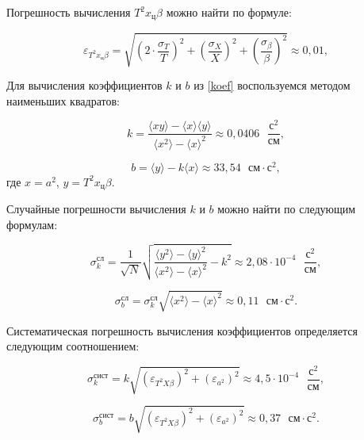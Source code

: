 \documentclass[a4paper,12pt]{article}
\begin{document}
 	Погрешность вычисления $ T^2x_\text{ц}\beta $ можно найти по формуле:
 	
 	\begin{equation}
 		\varepsilon_{T^2x_\text{ц}\beta} = \sqrt{\left( 2\cdot\frac{\sigma_T}{T} \right)^2 + \left(  \frac{\sigma_X}{X} \right)^2 + \left(\frac{\sigma_{\beta}}{\beta}\right)^2} \approx 0,01  ,
 	\end{equation}
 	
 	Для вычисления коэффициентов $ k $ и $ b $ из \eqref{koef} воспользуемся методом наименьших квадратов:
 	
 	\begin{equation}
 		k=\frac{\langle xy\rangle-\langle x\rangle \langle y\rangle}{\langle x^2\rangle - \langle x\rangle^2}\approx 0,0406\text{ }\frac{\text{с}^2}{\text{см}},
 	\end{equation}
 	
 	\begin{equation}
 		b=\langle y \rangle -k\langle x \rangle\approx 33,54\text{ }\text{см}\cdot\text{с}^2,
 	\end{equation}
 	где $ x=a^2 $, $ y=T^2x_\text{ц}\beta $.
 	
 	Случайные погрешности вычисления $ k $ и $ b $ можно найти по следующим формулам:
 	
 	\begin{equation}
 		\sigma_k^\text{сл}=\frac{1}{\sqrt{N}}\sqrt{\frac{\langle y^2 \rangle - \langle y \rangle^2}{\langle x^2 \rangle - \langle x \rangle^2} - k^2  } \approx 2,08\cdot10^{-4} \text{ }\frac{\text{с}^2}{\text{см}},
 	\end{equation}
 	
 	\begin{equation}
 		\sigma_b^\text{сл}= \sigma_k^\text{сл} \sqrt{\langle x^2 \rangle - \langle x \rangle^2} \approx 0,11 \text{ }\text{см}\cdot\text{с}^2.
 	\end{equation}
 	
 	Систематическая погрешность вычисления коэффициентов определяется следующим соотношением:
 	
 	\begin{equation}
 		\sigma^\text{сист}_k = k\sqrt{\left( \varepsilon_{T^2X\beta} \right)^2 + \left( \varepsilon_{a^2} \right)^2 } \approx 4,5\cdot10^{-4} \text{ }\frac{\text{с}^2}{\text{см}},
 	\end{equation}
 	
 	\begin{equation}
 		\sigma^\text{сист}_b = b\sqrt{\left( \varepsilon_{T^2X\beta} \right)^2 + \left( \varepsilon_{a^2} \right)^2 } \approx  0,37 \text{ }\text{см}\cdot\text{с}^2.
 	\end{equation}
 	
\end{document}
